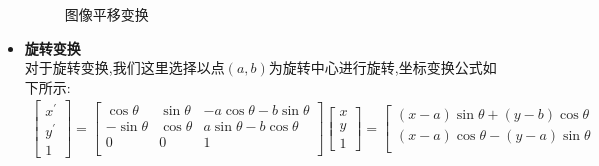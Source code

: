 \documentclass[UTF8,a4paper,10pt]{ctexart}
\begin{document}
\begin{flushleft}
\begin{itemize}
            \begin{figure}[htbp]
                \centering
                \caption{图像平移变换}
                \label{fig:fig_move}
            \end{figure}
            \item \textbf{旋转变换}\\
            \hspace{2em}对于旋转变换,我们这里选择以点$(a,b)$为旋转中心进行旋转,坐标变换公式如下所示:
            \begin{eqnarray}
                \left[\begin{array}{c}
                    x^{\prime}\\
                    y^{\prime}\\
                    1
                \end{array}\right]=\left[\begin{array}{ccc}
                    \cos{\theta} & \sin{\theta} & -a\cos{\theta}-b\sin{\theta}\\
                    -\sin{\theta} & \cos{\theta} & a\sin{\theta}-b\cos{\theta}\\
                    0 & 0 & 1\\
                \end{array}\right]\left[\begin{array}{c}
                    x\\
                    y\\
                    1
                \end{array}\right]=\left[\begin{array}{c}
                    (x-a)\sin{\theta}+(y-b)\cos\theta\\
                    (x-a)\cos{\theta}-(y-a)\sin\theta\\

\end{array}
\end{eqnarray}
\end{itemize}
\end{flushleft}
\end{document}
